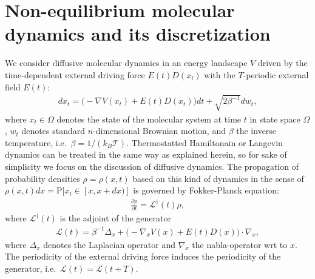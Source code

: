 \documentclass[aps, pre, preprint,unsortedaddress,a4paper,onecolumn,showkeys]{revtex4}
\newcommand{\vect}[1]{#1}
\newcommand{\ml}[0]{\mathcal {L}}
\newcommand{\prob}{\textrm{P}}
\begin{document}
\section{Non-equilibrium molecular dynamics and its discretization}
\label{sec:disc}
We consider diffusive molecular dynamics in an energy landscape $V$ driven by the time-dependent external driving force $E(t)D(x_t)$ with the
$T$-periodic external field $E(t)$:
\begin{align}
  \label{eq:disc-1}
  d\vect x_t = \Big(-\nabla V(\vect x_t) + E(t) D(\vect x_t)\Big)dt + \sqrt{2\beta^{-1}} d\vect w_t, 
\end{align}
where $x_t\in\Omega$ denotes the state of the molecular system at time $t$ in state space $\Omega$, $\vect w_t$ denotes standard $n$-dimensional Brownian motion, and $\beta$ the inverse temperature,
i.e.~$\beta = 1/(k_B\mathcal T)$.
Thermostatted Hamiltonain or Langevin dynamics can be treated in the same way as explained herein, so for sake of simplicity we focus on the discussion of diffusive dynamics.
The propagation of probability
densities $\rho=\rho(\vect x,t)$ based on this kind of dynamics in the sense
of $\rho(\vect x,t)dx=\prob[\vect x_t\in [\vect x,\vect x+d\vect x)]$ is governed by
Fokker-Planck equation:
\begin{align}
  \label{eq:disc-fp}
  \frac{\partial \rho}{\partial t} = \ml^\dagger(t) \rho,
\end{align}
where $\ml^\dagger(t)$ is the adjoint of the generator
\begin{align}
  \label{eq:disc-3}
  \ml(t)=\beta^{-1}\Delta_{\vect x}+\Big(-\nabla_x V(\vect x) + E(t)D(\vect x)\Big)\cdot\nabla_{\vect x},
\end{align}
where $\Delta_{\vect x}$ denotes the Laplacian operator and $\nabla_{\vect x}$
the nabla-operator wrt to $\vect x$. 
The periodicity of the external driving force induces the periodicity of the generator,
i.e.~$\ml(t) = \ml(t+T)$.  

\end{document}
